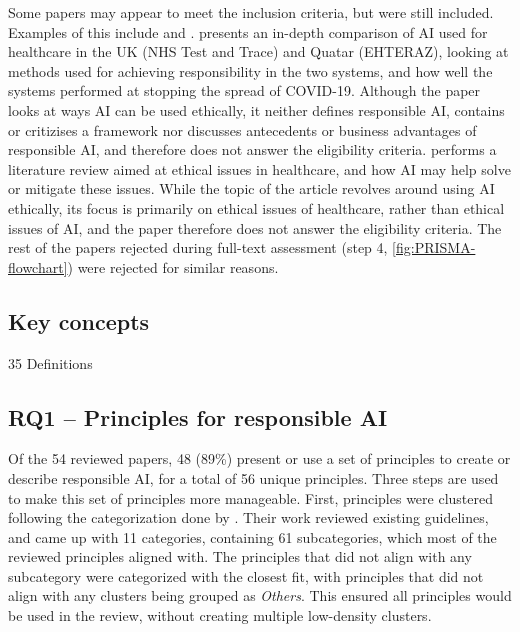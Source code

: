 Some papers may appear to meet the inclusion criteria, but were still included. Examples of this include \textcite{ElHaddadeh_2021} and \textcite{Trocin_2021}. \textcite{ElHaddadeh_2021} presents an in-depth comparison of AI used for healthcare in the UK (NHS Test and Trace) and Quatar (EHTERAZ), looking at methods used for achieving responsibility in the two systems, and how well the systems performed at stopping the spread of COVID-19. Although the paper looks at ways AI can be used ethically, it neither defines responsible AI, contains or critizises a framework nor discusses antecedents or business advantages of responsible AI, and therefore does not answer the eligibility criteria. \textcite{Trocin_2021} performs a literature review aimed at ethical issues in healthcare, and how AI may help solve or mitigate these issues. While the topic of the article revolves around using AI ethically, its focus is primarily on ethical issues of healthcare, rather than ethical issues of AI, and the paper therefore does not answer the eligibility criteria. The rest of the papers rejected during full-text assessment (step 4, \autoref{fig:PRISMA-flowchart}) were rejected for similar reasons.


\subsection{Key concepts}
{35 Definitions}


\subsection{RQ1 -- Principles for responsible AI}
\label{sec:results-rq1}
Of the 54 reviewed papers, 48 (89\%) present or use a set of principles to create or describe responsible AI, for a total of 56 unique principles. Three steps are used to make this set of principles more manageable. First, principles were clustered following the categorization done by \textcite{Ryan_2021}. Their work reviewed existing guidelines, and came up with 11 categories, containing 61 subcategories, which most of the reviewed principles aligned with. The principles that did not align with any subcategory were categorized with the closest fit, with principles that did not align with any clusters being grouped as \textit{Others}. This ensured all principles would be used in the review, without creating multiple low-density clusters.

